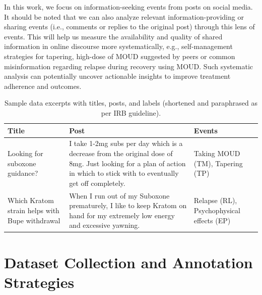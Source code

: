 \documentclass[letterpaper]{article}
\begin{document}
In this work, we focus on information-seeking events from posts on social media. It should be noted that we can also analyze relevant information-providing or sharing events (i.e., comments or replies to the original post) through this lens of events. This will help us measure the availability and quality of shared information in online discourse more systematically, e.g., self-management strategies for tapering, high-dose of MOUD suggested by peers or common misinformation regarding relapse during recovery using MOUD.
Such systematic analysis can potentially uncover actionable insights to improve treatment adherence and outcomes.



\begin{table}[ht!]
\centering
\footnotesize
\begin{tabular}{L{3.5cm} L{10.5cm} C{2.8cm} }
\hline
\textbf{Title}&\textbf{Post}&\textbf{Events}\\
\hline
Looking for suboxone guidance? & I take 1-2mg subs per day which is a decrease from the original dose of 8mg. Just looking for a plan of action in which to stick with to eventually get off completely. & Taking MOUD (TM), Tapering (TP) \\
\midrule
Which Kratom strain helps with Bupe withdrawal & When I run out of my Suboxone prematurely, I like to keep Kratom on hand for my extremely low energy and excessive yawning. & Relapse (RL), Psychophysical effects (EP) \\
\hline

\end{tabular}
\caption{Sample data excerpts with titles, posts, and labels (shortened and paraphrased as per IRB guideline).}
\label{samples}
\end{table}

\section{Dataset Collection and Annotation Strategies}
\end{document}
